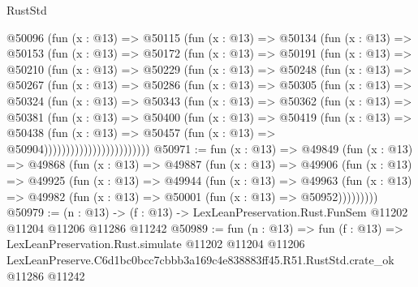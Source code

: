 \begin{lexlean}{RustStd}
\begin{coremodule}
          @50096
            (fun (x : @13) =>
            @50115
              (fun (x : @13) =>
              @50134
                (fun (x : @13) =>
                @50153
                  (fun (x : @13) =>
                  @50172
                    (fun (x : @13) =>
                    @50191
                      (fun (x : @13) =>
                      @50210
                        (fun (x : @13) =>
                        @50229
                          (fun (x : @13) =>
                          @50248
                            (fun (x : @13) =>
                            @50267
                              (fun (x : @13) =>
                              @50286
                                (fun (x : @13) =>
                                @50305
                                  (fun (x : @13) =>
                                  @50324
                                    (fun (x : @13) =>
                                    @50343
                                      (fun (x : @13) =>
                                      @50362
                                        (fun (x : @13) =>
                                        @50381
                                          (fun (x : @13) =>
                                          @50400
                                            (fun (x : @13) =>
                                            @50419
                                              (fun (x : @13) =>
                                              @50438
                                                (fun (x : @13) =>
                                                @50457
                                                  (fun (x : @13) => @50904))))))))))))))))))))))))
@50971 := fun (x : @13) =>
  @49849
    (fun (x : @13) =>
    @49868
      (fun (x : @13) =>
      @49887
        (fun (x : @13) =>
        @49906
          (fun (x : @13) =>
          @49925
            (fun (x : @13) =>
            @49944
              (fun (x : @13) =>
              @49963
                (fun (x : @13) => @49982 (fun (x : @13) => @50001 (fun (x : @13) => @50952)))))))))
@50979 := (n : @13) ->
  (f : @13) -> LexLeanPreservation.Rust.FunSem @11202 @11204 @11206 @11286 @11242
@50989 := fun (n : @13) =>
  fun (f : @13) =>
  LexLeanPreservation.Rust.simulate
    @11202
    @11204
    @11206
    LexLeanPreserve.C6d1bc0bcc7cbbb3a169c4e838883ff45.R51.RustStd.crate_ok
    @11286
    @11242
\end{coremodule}
\end{lexlean}
